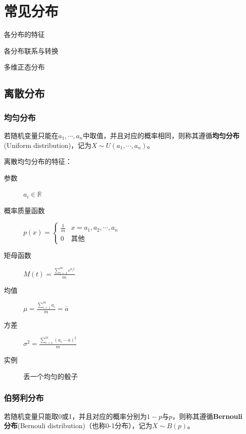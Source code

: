 \chapter{常见分布}
\begin{introduction}[考试重点]
    \item 各分布的特征
    \item 各分布联系与转换
    \item 多维正态分布
\end{introduction}
\section{离散分布}

\subsection{均匀分布}

\begin{definition}[离散均匀分布]
    若随机变量只能在$a_1,\cdots ,a_n$中取值，并且对应的概率相同，则称其遵循\textbf{均匀分布}(Uniform distribution)，记为$X \sim U(a_1,\cdots ,a_n)$。
\end{definition}

离散均匀分布的特征：
\begin{description}
    \item[参数] $a_i \in \mathbb{R}$
    \item[概率质量函数] $p(x)=\begin{cases}
                \frac{1}{m} & x=a_1,a_2,\cdots ,a_n \\
                0           & \text{其他}
            \end{cases}$
    \item[矩母函数] $M(t)=\frac{\sum_{i=1}^m e^{a_i t}}{m}$
    \item[均值] $\mu=\frac{\sum_{i=1}^m a_i }{m}=\overline{a}$
    \item[方差] $\sigma^2=\frac{\sum_{i=1}^m (a_i-\overline{a})^2 }{m}$
    \item[实例] 丢一个均匀的骰子
\end{description}

\subsection{伯努利分布}

\begin{definition}[Bernouli分布]
    若随机变量只能取0或1，并且对应的概率分别为$1-p$与$p$，则称其遵循\textbf{Bernouli分布}(Bernouli distribution)（也称0-1分布），记为$X \sim B(p)$。
\end{definition}

